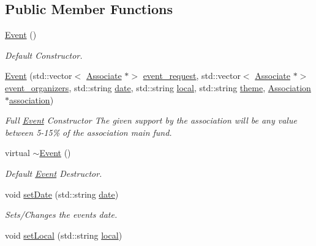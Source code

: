 \subsection*{Public Member Functions}
\begin{DoxyCompactItemize}
\item 
\hyperlink{classEvent_a5a40dd4708297f7031e29b39e039ae10}{Event} ()
\begin{DoxyCompactList}\small\item\em Default Constructor. \end{DoxyCompactList}\item 
\hyperlink{classEvent_af5dc5a200023c83243ab755e69eb4827}{Event} (std\+::vector$<$ \hyperlink{classAssociate}{Associate} $\ast$$>$ \hyperlink{classEvent_a6cec387dca85f0a0e8419cfc94eb320e}{event\+\_\+request}, std\+::vector$<$ \hyperlink{classAssociate}{Associate} $\ast$$>$ \hyperlink{classEvent_ad35e04c759fdbfad75aed0b6e2eef63c}{event\+\_\+organizers}, std\+::string \hyperlink{classEvent_a9a93c9d38211f84cd6e347690e177f11}{date}, std\+::string \hyperlink{classEvent_a3d1f28a3bde9ab718d5b0003f8ab5129}{local}, std\+::string \hyperlink{classEvent_aa9cc4378d5cecaadc8e6de92b313e6f8}{theme}, \hyperlink{classAssociation}{Association} $\ast$\hyperlink{classEvent_a3c8694833e50dbd2e37943eff1f5c9b1}{association})
\begin{DoxyCompactList}\small\item\em Full \hyperlink{classEvent}{Event} Constructor The given support by the association will be any value between 5-\/15\% of the association main fund. \end{DoxyCompactList}\item 
virtual \hyperlink{classEvent_a7704ec01ce91e673885792054214b3d2}{$\sim$\+Event} ()
\begin{DoxyCompactList}\small\item\em Default \hyperlink{classEvent}{Event} Destructor. \end{DoxyCompactList}\item 
void \hyperlink{classEvent_a21f01e4574335753b415d3445f1ebdff}{set\+Date} (std\+::string \hyperlink{classEvent_a9a93c9d38211f84cd6e347690e177f11}{date})
\begin{DoxyCompactList}\small\item\em Sets/\+Changes the event\textquotesingle{}s date. \end{DoxyCompactList}\item 
void \hyperlink{classEvent_ab4e1fd7cd5e56f58d3cd36a69e475054}{set\+Local} (std\+::string \hyperlink{classEvent_a3d1f28a3bde9ab718d5b0003f8ab5129}{local})

\end{DoxyCompactItemize}
